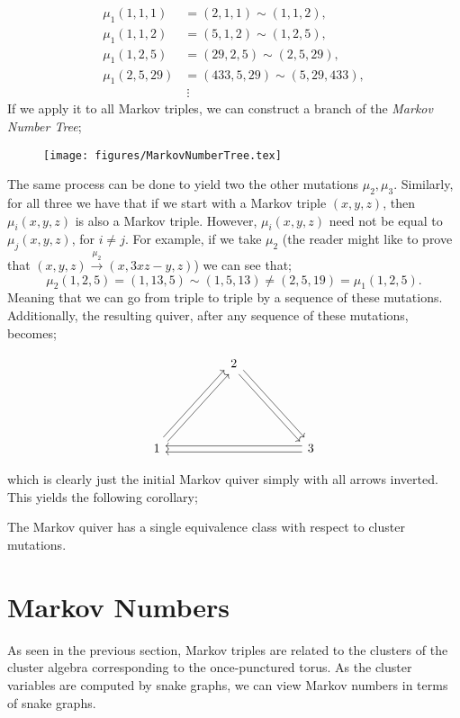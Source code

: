 \begin{align*}
    \mu_1(1,1,1) &= (2,1,1) \sim (1,1,2), \\
    \mu_1(1,1,2) &= (5,1,2) \sim (1,2,5), \\
    \mu_1(1,2,5) &= (29,2,5) \sim (2,5,29), \\
    \mu_1(2,5,29) &= (433,5,29) \sim (5,29,433), \\
    & \ \vdots
\end{align*}
If we apply it to all Markov triples, we can construct a branch of the \emph{Markov Number Tree};
\begin{figure}[H]
    \centering
    \texttt{[image: figures/MarkovNumberTree.tex]}
\end{figure}
 The same process can be done to yield two the other mutations $\mu_2,\mu_3$. Similarly, for all three we have that if we start with a Markov triple $(x,y,z)$, then $\mu_i(x,y,z)$ is also a Markov triple. However, $\mu_i(x,y,z)$ need not be equal to $\mu_j(x,y,z)$, for $i \ne j$. For example, if we take $\mu_2$ (the reader might like to prove that $(x,y,z) \xrightarrow{\mu_2} (x,3xz-y,z)$) we can see that;
\begin{equation*}
    \mu_2(1,2,5) = (1,13,5) \sim (1,5,13) \ne (2,5,19) = \mu_1(1,2,5).
\end{equation*}
Meaning that we can go from triple to triple by a sequence of these mutations. Additionally, the resulting quiver, after any sequence of these mutations, becomes;
\begin{figure}[H]
    \centering
    \[\begin{tikzcd}
	&& 2\\
	\\
	\\
	1 &&&& 3
	\arrow[shift left=1, from=4-1, to=1-3]
	\arrow[shift right=1, from=4-1, to=1-3]
	\arrow[shift left=1, from=1-3, to=4-5]
	\arrow[shift right=1, from=1-3, to=4-5]
	\arrow[shift left=1, from=4-5, to=4-1]
	\arrow[shift right=1, from=4-5, to=4-1]
\end{tikzcd}\]
\end{figure}
which is clearly just the initial Markov quiver simply with all arrows inverted. This yields the following corollary;
\begin{corollary}
The Markov quiver has a single equivalence class with respect to cluster mutations.
\end{corollary}

\section{Markov Numbers}
As seen in the previous section, Markov triples are related to the clusters of the cluster algebra corresponding to the once-punctured torus. As the cluster variables are computed by snake graphs, we can view Markov numbers in terms of snake graphs. 
